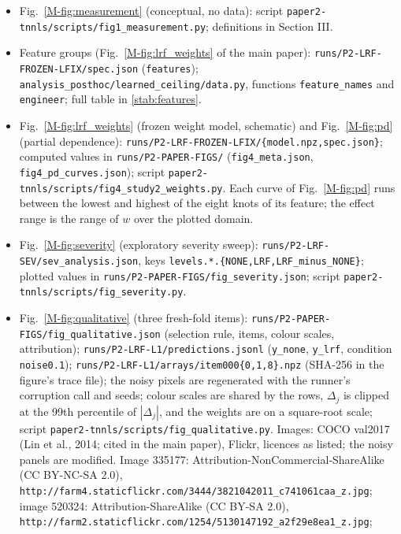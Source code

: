 \documentclass[journal,onecolumn]{IEEEtran}
\theoremstyle{plain}
\begin{document}
\begin{itemize}
\item Fig.~\ref{M-fig:measurement} (conceptual, no data): script \nolinkurl{paper2-tnnls/scripts/fig1_measurement.py}; definitions in Section III.
\item Feature groups (Fig.~\ref{M-fig:lrf_weights} of the main paper): \nolinkurl{runs/P2-LRF-FROZEN-LFIX/spec.json}
(\nolinkurl{features}); \nolinkurl{analysis_posthoc/learned_ceiling/data.py}, functions \nolinkurl{feature_names} and \nolinkurl{engineer};
full table in \cref{stab:features}.
\item Fig.~\ref{M-fig:lrf_weights} (frozen weight model, schematic) and Fig.~\ref{M-fig:pd} (partial dependence): \nolinkurl{runs/P2-LRF-FROZEN-LFIX/{model.npz,spec.json}}; computed values in
\nolinkurl{runs/P2-PAPER-FIGS/} (\nolinkurl{fig4_meta.json}, \nolinkurl{fig4_pd_curves.json}); script \nolinkurl{paper2-tnnls/scripts/fig4_study2_weights.py}. Each curve of Fig.~\ref{M-fig:pd} runs between
the lowest and highest of the eight knots of its feature; the effect range is the range of $w$ over the plotted domain.
\item Fig.~\ref{M-fig:severity} (exploratory severity sweep): \nolinkurl{runs/P2-LRF-SEV/sev_analysis.json}, keys \nolinkurl{levels.*.{NONE,LRF,LRF_minus_NONE}}; plotted values in \nolinkurl{runs/P2-PAPER-FIGS/fig_severity.json}; script \nolinkurl{paper2-tnnls/scripts/fig_severity.py}.
\item Fig.~\ref{M-fig:qualitative} (three fresh-fold items): \nolinkurl{runs/P2-PAPER-FIGS/fig_qualitative.json} (selection rule, items, colour scales, attribution);
\nolinkurl{runs/P2-LRF-L1/predictions.jsonl} (\nolinkurl{y_none}, \nolinkurl{y_lrf}, condition \nolinkurl{noise0.1}); \nolinkurl{runs/P2-LRF-L1/arrays/item000{0,1,8}.npz}
(SHA-256 in the figure's trace file); the noisy pixels are regenerated with the runner's corruption call and seeds; colour scales are shared by the rows, $\Delta_j$ is clipped at the 99th percentile of $|\Delta_j|$, and the weights are on a square-root scale; script \nolinkurl{paper2-tnnls/scripts/fig_qualitative.py}.
Images: COCO val2017 (Lin et al., 2014; cited in the main paper), Flickr, licences as listed; the noisy panels are modified.
Image 335177: Attribution-NonCommercial-ShareAlike (CC BY-NC-SA 2.0), \nolinkurl{http://farm4.staticflickr.com/3444/3821042011_c741061caa_z.jpg};
image 520324: Attribution-ShareAlike (CC BY-SA 2.0), \nolinkurl{http://farm2.staticflickr.com/1254/5130147192_a2f29e8ea1_z.jpg};

\end{itemize}
\end{document}

